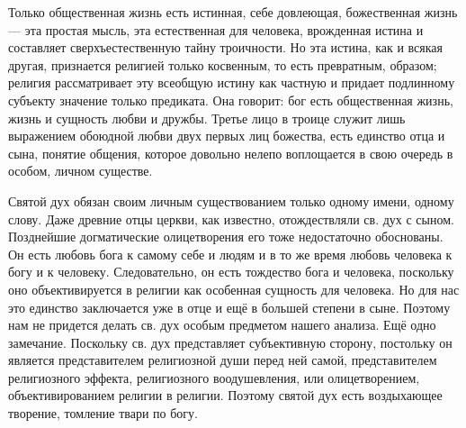 \documentclass[12pt,oneside]{book}
\begin{document}
Только общественная жизнь есть истинная, себе довлеющая, божественная жизнь --- эта простая мысль, эта естественная для человека, врожденная истина и составляет сверхъестественную тайну троичности. Но эта истина, как и всякая другая, признается религией только косвенным, то есть превратным, образом; религия рассматривает эту всеобщую истину как частную и придает подлинному субъекту значение только предиката. Она говорит: бог есть общественная жизнь, жизнь и сущность любви и дружбы. Третье лицо в троице служит лишь выражением обоюдной любви двух первых лиц божества, есть единство отца и сына, понятие общения, которое довольно нелепо воплощается в свою очередь в особом, личном существе.

Святой дух обязан своим личным существованием только одному имени, одному слову. Даже древние отцы церкви, как известно, отождествляли св. дух с сыном. Позднейшие догматические олицетворения его тоже недостаточно обоснованы. Он есть любовь бога к самому себе и людям и в то же время любовь человека к богу и к человеку. Следовательно, он есть тождество бога и человека, поскольку оно объективируется в религии как особенная сущность для человека. Но для нас это единство заключается уже в отце и ещё в большей степени в сыне. Поэтому нам не придется делать св. дух особым предметом нашего анализа. Ещё одно замечание. Поскольку св. дух представляет субъективную сторону, постольку он является представителем религиозной души перед ней самой, представителем религиозного эффекта, религиозного воодушевления, или олицетворением, объективированием религии в религии. Поэтому святой дух есть воздыхающее творение, томление твари по богу.
\end{document}
